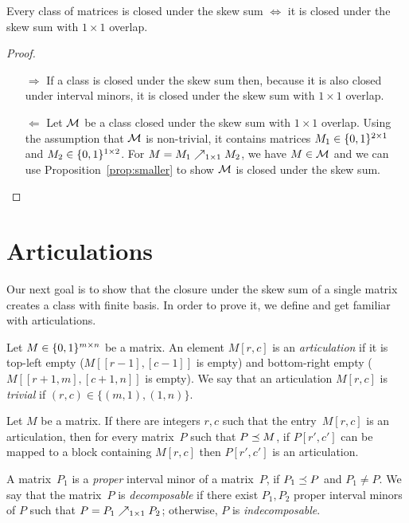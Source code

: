 \begin{prop}
\label{prop:0to1}
Every class of matrices is closed under the skew sum $\Leftrightarrow$ it is closed under the skew sum with $1\times1$ overlap.
\end{prop}
\begin{proof}
\begin{itemize}
	\item[$\Rightarrow$] If a class is closed under the skew sum then, because it is also closed under interval minors, it is closed under the skew sum with $1\times1$ overlap.
	\item[$\Leftarrow$] Let $\mathcal{M}$ be a class closed under the skew sum with $1\times1$ overlap. Using the assumption that $\mathcal{M}$ is non-trivial, it contains matrices $M_1\in\{0,1\}^{2\times1}$ and $M_2\in\{0,1\}^{1\times2}$. For $M=M_1\nearrow_{1\times1}M_2$, we have $M\in\mathcal{M}$ and we can use Proposition~\ref{prop:smaller} to show $\mathcal{M}$ is closed under the skew sum. \qedhere
\end{itemize}
\end{proof}

\section{Articulations}
Our next goal is to show that the closure under the skew sum of a single matrix creates a class with finite basis. In order to prove it, we define and get familiar with articulations.

\begin{defn}
Let $M\in\{0,1\}^{m\times n}$ be a matrix. An element $M[r,c]$ is an \emph{articulation} if it is top-left empty ($M[[r-1],[c-1]]$ is empty) and bottom-right empty ($M[[r+1,m],[c+1,n]]$ is empty). We say that an articulation $M[r,c]$ is \emph{trivial} if $(r,c)\in\{(m,1),(1,n)\}$.
\end{defn}

\begin{obs}
\label{obs:keep}
Let $M$ be a matrix. If there are integers $r,c$ such that the entry~$M[r,c]$ is an articulation, then for every matrix~$P$ such that $P\preceq M$, if $P[r',c']$ can be mapped to a block containing $M[r,c]$ then $P[r',c']$ is an articulation.
\end{obs}

\begin{defn}
A matrix~$P_1$ is a \emph{proper} interval minor of a matrix~$P$, if $P_1\preceq P$ and $P_1\neq P$. We say that the matrix~$P$ is \emph{decomposable} if there exist $P_1,P_2$ proper interval minors of $P$ such that $P=P_1\nearrow_{1\times1}P_2$; otherwise, $P$ is \emph{indecomposable}.
\end{defn}

